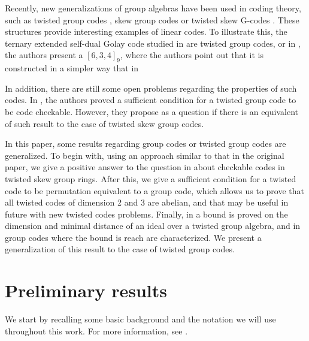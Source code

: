 \documentclass{article}
\begin{document}
Recently, new generalizations of group algebras have been used in coding theory, such as  twisted group codes \cite{deLaCruzWillems2021}, skew group codes \cite{BoucherGeiselmannUlmer2007} or twisted skew G-codes \cite{Behajaina2024Twisted}. These structures provide interesting examples of linear codes. To illustrate this, the  ternary extended self-dual Golay code studied in \cite{deLaCruzWillems2021} are twisted group codes, or in \cite{Behajaina2024Twisted}, the authors present a $[6, 3, 4]_9$, where the authors point out that it is constructed in a simpler way that in \cite{Grassl}

In addition, there are still some open problems regarding the properties of such codes. In \cite{Behajaina2024Twisted}, the authors proved a sufficient condition for a twisted group code to be code checkable. However, they propose as a question if there is an equivalent of such result to the case of twisted skew group codes.

In this paper, some results regarding group codes or twisted group codes are generalized. To begin with, using an approach similar to that in the original paper, we give a positive answer to the question in \cite{Behajaina2024Twisted} about checkable codes in twisted skew group rings. After this, we give a sufficient condition for a twisted code to be permutation equivalent to a group code, which allows us to prove that all twisted codes of dimension 2 and 3 are abelian, and that may be useful in future with new twisted codes problems. Finally, in \cite{WillemsTwistedToAppear} a bound is proved on the dimension and minimal distance of an ideal over a twisted group algebra, and in \cite{Borello2022Ideals} group codes where the bound is reach are characterized. We present a generalization of this result to the case of twisted group codes.

\section{Preliminary results}
We start by recalling some basic background and the notation we will use throughout this work. For more information, see \cite{Karpilovsky1989}.
\end{document}
